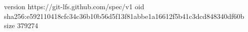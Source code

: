 version https://git-lfs.github.com/spec/v1
oid sha256:e592110418cfc34c36b10b56d5f13f81abbe1a16612f5b41c3dcd848340df60b
size 379274
